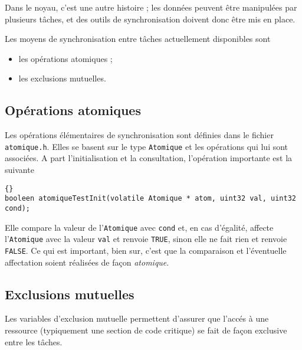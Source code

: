    Dans le noyau, c'est une autre histoire ; les données peuvent être
manipulées par plusieurs tâches, et des outils de synchronisation
doivent donc être mis en place.


   
   Les moyens de synchronisation entre tâches actuellement disponibles
sont 

\begin{itemize}
   \item les opérations atomiques ;
   \item les exclusions mutuelles.
\end{itemize}

\subsection{Opérations atomiques}

   Les opérations élémentaires de synchronisation sont définies dans
le fichier {\tt atomique.h}. Elles se basent sur le type
\lstinline!Atomique! et les opérations qui lui sont associées. A part
l'initialisation et la consultation, l'opération importante est la
suivante

\begin{lstlisting}{}
booleen atomiqueTestInit(volatile Atomique * atom, uint32 val, uint32 cond);
\end{lstlisting}

   Elle compare la valeur de l'\lstinline!Atomique! avec
\lstinline!cond! et, en cas d'égalité, affecte l'\lstinline!Atomique!
avec la valeur \lstinline!val! et renvoie \lstinline!TRUE!, sinon elle 
ne fait rien et renvoie \lstinline!FALSE!. Ce qui est important, bien
sur, c'est que la comparaison et l'éventuelle affectation soient
réalisées de façon {\em atomique}.

\subsection{Exclusions mutuelles}

   Les variables d'exclusion mutuelle permettent d'assurer que l'accés
à une ressource (typiquement une section de code critique) se fait de
façon exclusive entre les tâches.

